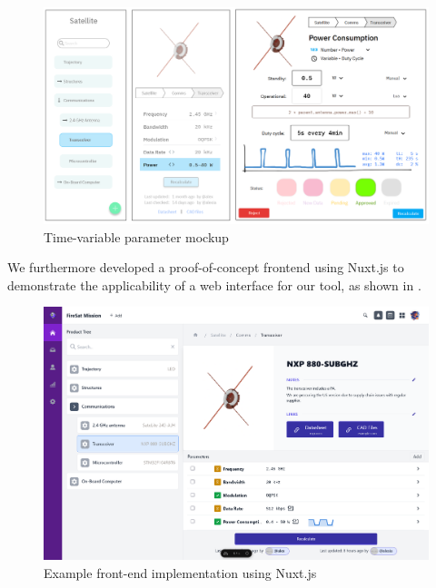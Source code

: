\documentclass[]{iac}
\begin{document}
\begin{figure}[h]
    \centering
    \includegraphics[width=\textwidth]{media/mockup_4.png}
    \caption{Time-variable parameter mockup}
    \label{fig:m4}
\end{figure}

We furthermore developed a proof-of-concept frontend using Nuxt.js to demonstrate the applicability of a web interface for our tool, as shown in .
\begin{figure}[h]
    \centering
    \includegraphics[width=\textwidth]{media/platform.png}
    \caption{Example front-end implementation using Nuxt.js}
    \label{fig:nuxt}
\end{figure}
\end{document}
